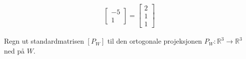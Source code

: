 \documentclass[11pt, a4paper, norsk]{NTNUoving}
\begin{document}
\begin{oppgave}
\begin{punkt}
\begin{align*}
\begin{bmatrix}
                                        -5 \\
                                        1
                                    \end{bmatrix} = \begin{bmatrix}
                                        2 \\
                                        1 \\ 
                                        1
                                    \end{bmatrix}
            \end{align*}
        \end{punkt}
        \begin{punkt}
            Regn ut standardmatrisen $[P_{W}]$ til den ortogonale
projeksjonen $P_{W}: \mathbb{R}^3 \rightarrow \mathbb{R}^3$ ned på $W$. 
            

\end{punkt}
\end{oppgave}
\end{document}
